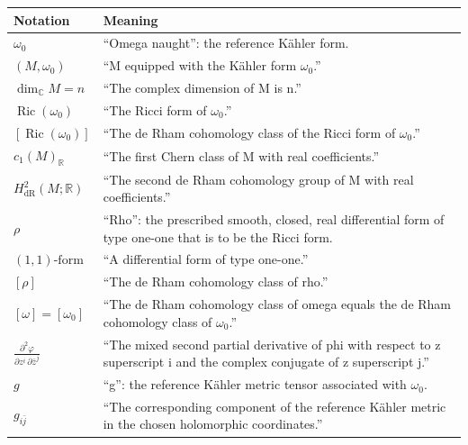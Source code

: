 \documentclass[11pt]{article}
\begin{document}
\newpage
\begingroup
\renewcommand{\arraystretch}{1.25}
\begin{tabularx}{\textwidth}{@{}>{\raggedright\arraybackslash}p{}>{\raggedright\arraybackslash}X@{}}
\textbf{Notation} & \textbf{Meaning} \\
\hline
$\omega_0$
& ``Omega naught'': the reference K\"ahler form. \\

$(M,\omega_0)$
& ``M equipped with the K\"ahler form $\omega_0$.'' \\

$\dim_{\mathbb C} M=n$
& ``The complex dimension of M is n.'' \\

$\operatorname{Ric}(\omega_0)$
& ``The Ricci form of $\omega_0$.'' \\

$[\operatorname{Ric}(\omega_0)]$
& ``The de Rham cohomology class of the Ricci form of $\omega_0$.'' \\

$c_1(M)_{\mathbb R}$
& ``The first Chern class of M with real coefficients.'' \\

$H_{\mathrm{dR}}^2(M;\mathbb R)$
& ``The second de Rham cohomology group of M with real coefficients.'' \\

$\rho$
& ``Rho'': the prescribed smooth, closed, real differential form
of type one-one that is to be the Ricci form. \\

$(1,1)\text{-form}$
& ``A differential form of type one-one.'' \\

$[\rho]$
& ``The de Rham cohomology class of rho.'' \\

$[\omega]=[\omega_0]$
& ``The de Rham cohomology class of omega equals the de Rham
cohomology class of $\omega_0$.'' \\

$\displaystyle
\frac{\partial^2\varphi}{\partial z^i\,\partial\bar z^j}$
& ``The mixed second partial derivative of phi with respect to
z superscript i and the complex conjugate of z superscript j.'' \\

$g$
& ``g'': the reference K\"ahler metric tensor associated with $\omega_0$. \\

$g_{i\bar j}$
& ``The corresponding component
of the reference K\"ahler metric in the chosen holomorphic coordinates.'' \\


\end{tabularx}
\end{document}
